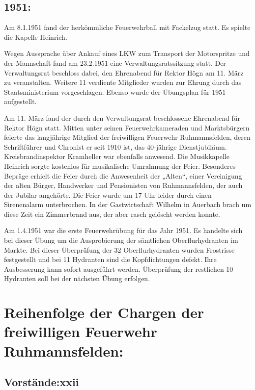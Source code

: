 \documentclass[12pt,a4paper]{book}
\begin{document}
\section{1951:}

Am 8.1.1951 fand der herkömmliche Feuerwehrball mit Fackelzug statt. Es spielte
die Kapelle Heinrich.

Wegen Aussprache über Ankauf eines LKW zum Transport der Motorspritze und der
Mannschaft fand am 23.2.1951 eine Verwaltungsratssitzung statt. Der
Verwaltungsrat beschloss dabei, den Ehrenabend für Rektor Högn am 11. März zu
veranstalten. Weitere 11 verdiente Mitglieder wurden zur Ehrung durch das
Staatsministerium vorgeschlagen. Ebenso wurde der Übungsplan für 1951
aufgestellt.

Am 11. März fand der durch den Verwaltungsrat beschlossene Ehrenabend für Rektor
Högn statt. Mitten unter seinen Feuerwehrkameraden und Marktsbürgern feierte das
langjährige Mitglied der freiwilligen Feuerwehr Ruhmannsfelden, deren
Schriftführer und Chronist er seit 1910 ist, das 40-jährige Dienstjubiläum.
Kreisbrandinspektor Kramheller war ebenfalls anwesend. Die Musikkapelle Heinrich
sorgte kostenlos für musikalische Umrahmung der Feier. Besonderes Bepräge
erhielt die Feier durch die Anwesenheit der „Alten“, einer Vereinigung der alten
Bürger, Handwerker und Pensionisten von Ruhmannsfelden, der auch der Jubilar
angehörte. Die Feier wurde um 17 Uhr leider durch einen Sirenenalarm
unterbrochen. In der Gastwirtschaft Wilhelm in Auerbach brach um diese Zeit ein
Zimmerbrand aus, der aber rasch gelöscht werden konnte.

Am 1.4.1951 war die erste Feuerwehrübung für das Jahr 1951. Es handelte sich bei
dieser Übung um die Ausprobierung der sämtlichen Oberflurhydranten im Markte.
Bei dieser Überprüfung der 32 Oberflurhydranten wurden Frostrisse festgestellt
und bei 11 Hydranten sind die Kopfdichtungen defekt. Ihre Ausbesserung kann
sofort ausgeführt werden. Überprüfung der restlichen 10 Hydranten soll bei der
nächsten Übung erfolgen.

\chapter{Reihenfolge der Chargen der freiwilligen Feuerwehr Ruhmannsfelden:}

\section{Vorstände:xxii}
\end{document}
